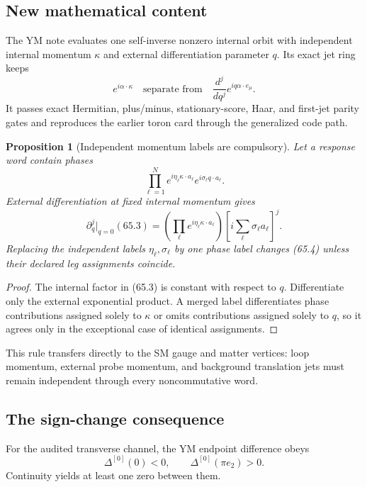 \documentclass[11pt]{article}
\newtheorem{proposition}[theorem]{Proposition}
\begin{document}
\subsection{New mathematical content}

The YM note evaluates one self-inverse nonzero internal orbit with
independent internal momentum \(\kappa\) and external differentiation
parameter \(q\).  Its exact jet ring keeps
\[
                    e^{i\alpha\cdot\kappa}
                    \quad\text{separate from}\quad
                    \frac{d^j}{dq^j}e^{iq\alpha\cdot e_\mu}.  \tag{65.2}
\]
It passes exact Hermitian, plus/minus, stationary-score, Haar, and
first-jet parity gates and reproduces the earlier toron card through
the generalized code path.

\begin{proposition}[Independent momentum labels are compulsory]
\label{prop:v11v65-labels}
Let a response word contain phases
\[
                 \prod_{\ell=1}^N
                 e^{i\eta_\ell\kappa\cdot a_\ell}
                 e^{i\sigma_\ell q\cdot a_\ell}.              \tag{65.3}
\]
External differentiation at fixed internal momentum gives
\[
 \partial_q^j\big|_{q=0}(65.3)
 =\left(\prod_\ell e^{i\eta_\ell\kappa\cdot a_\ell}\right)
  \left[i\sum_\ell\sigma_\ell a_\ell\right]^j.               \tag{65.4}
\]
Replacing the independent labels \(\eta_\ell,\sigma_\ell\) by one
phase label changes (65.4) unless their declared leg assignments
coincide.
\end{proposition}

\begin{proof}
The internal factor in (65.3) is constant with respect to \(q\).
Differentiate only the external exponential product.  A merged label
differentiates phase contributions assigned solely to \(\kappa\) or
omits contributions assigned solely to \(q\), so it agrees only in the
exceptional case of identical assignments.
\end{proof}

This rule transfers directly to the SM gauge and matter vertices:
loop momentum, external probe momentum, and background translation
jets must remain independent through every noncommutative word.

\subsection{The sign-change consequence}

For the audited transverse channel, the YM endpoint difference obeys
\[
                        \Delta^{[0]}(0)<0,\qquad
                        \Delta^{[0]}(\pi e_2)>0.               \tag{65.5}
\]
Continuity yields at least one zero between them.
\end{document}
